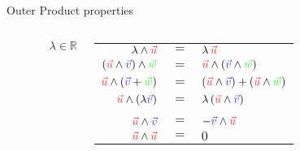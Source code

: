 \begin{frame}[t]{Outer Product properties}

    \begin{center}
    \end{center}

    \begin{columns}
        {
            $~~~~~~~~~~~~~~~~~ \lambda \in \mathbb{R}$

            \begin{tabular}{rcl}
                $\lambda \wedge \textcolor{u}{\vec{u}}$                                                & $=$ & $\lambda\,\textcolor{u}{\vec{u}}$                                                                                 \\
                $(\textcolor{u}{\vec{u}} \wedge \textcolor{v}{\vec{v}}) \wedge \textcolor{w}{\vec{w}}$ & $=$ & $\textcolor{u}{\vec{u}} \wedge (\textcolor{v}{\vec{v}} \wedge \textcolor{w}{\vec{w}})$                            \\
                $\textcolor{u}{\vec{u}} \wedge (\textcolor{v}{\vec{v}} + \textcolor{w}{\vec{w}})$      & $=$ & $(\textcolor{u}{\vec{u}} \wedge \textcolor{v}{\vec{v}}) + (\textcolor{u}{\vec{u}} \wedge \textcolor{w}{\vec{w}})$ \\
                $\textcolor{u}{\vec{u}} \wedge (\lambda \textcolor{v}{\vec{v}})$                       & $=$ & $\lambda\,(\textcolor{u}{\vec{u}} \wedge \textcolor{v}{\vec{v}})$                                                 \\
                \\
                $\textcolor{u}{\vec{u}} \wedge \textcolor{v}{\vec{v}}$                                 & $=$ & $-\textcolor{v}{\vec{v}} \wedge \textcolor{u}{\vec{u}}$                                                           \\
                $\textcolor{u}{\vec{u}} \wedge \textcolor{u}{\vec{u}}$                                 & $=$ & $0$                                                                                                               \\
            \end{tabular}
        }

        \vspace{2em}


        \begin{minipage}[c][0.6\textheight][c]{\linewidth} %
            \centering
            \begin{tikzpicture}


\end{tikzpicture}
\end{minipage}
\end{columns}
\end{frame}
